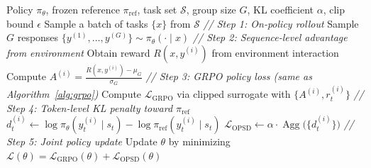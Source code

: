 \documentclass{llmxive}
\providecommand{\mycomment}[1]{\textit{// #1}}
\begin{document}
\begin{algorithm}[t]
  \caption{GRPO+OPSD}
  \label{alg:grpo_opsd}
  \begin{algorithmic}[1]
  \Require Policy $\pi_{\theta}$, frozen reference $\pi_{\mathrm{ref}}$, task set
  $\mathcal{S}$, group size $G$, KL coefficient $\alpha$, clip bound $\epsilon$
      \State Sample a batch of tasks $\{x\}$ from $\mathcal{S}$
          \State \mycomment{Step 1: On-policy rollout}
          \State Sample $G$ responses $\{y^{(1)},\dots,y^{(G)}\} \sim \pi_{\theta}(\cdot \mid
  x)$
          \State \mycomment{Step 2: Sequence-level advantage from environment}
              \State Obtain reward $R(x, y^{(i)})$ from environment interaction
          \EndFor
          \State Compute $A^{(i)} = \frac{R(x,y^{(i)}) - \mu_G}{\sigma_G}$
          \State \mycomment{Step 3: GRPO policy loss (same as Algorithm~\ref{alg:grpo})}
          \State Compute $\mathcal{L}_{\mathrm{GRPO}}$ via clipped surrogate with $\{A^{(i)},
  r_t^{(i)}\}$
          \State \mycomment{Step 4: Token-level KL penalty toward $\pi_{\mathrm{ref}}$}
                  \State $d_t^{(i)} \gets \log\pi_{\theta}(y_t^{(i)} \mid s_t) -
  \log\pi_{\mathrm{ref}}(y_t^{(i)} \mid s_t)$
              \EndFor
          \EndFor
          \State $\mathcal{L}_{\mathrm{OPSD}} \gets
  \alpha \cdot \operatorname{Agg}\!\bigl(\{d_t^{(i)}\}\bigr)$
          \State \mycomment{Step 5: Joint policy update}
          \State Update $\theta$ by minimizing $\mathcal{L}(\theta) =
  \mathcal{L}_{\mathrm{GRPO}}(\theta) + \mathcal{L}_{\mathrm{OPSD}}(\theta)$
      \EndFor
  \EndFor
  \end{algorithmic}
\end{algorithm}
\end{document}
